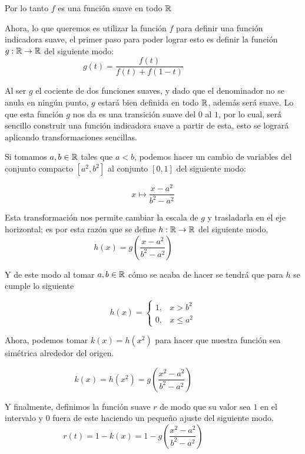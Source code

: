 \begin{example}
	Por lo tanto $f$ es una función suave en todo $\mathbb{R}$

	Ahora, lo que queremos es utilizar la función $f$ para definir una función indicadora suave, el primer paso para poder lograr esto es definir la función $g: \mathbb{R} \to \mathbb{R}$ del siguiente modo:
	\[
		g(t) = \frac{f(t)}{f(t)+f(1-t)}
		\qquad \qquad
		\begin{gathered}
			
		\end{gathered}
	\]


	Al ser $g$ el cociente de dos funciones suaves, y dado que el denominador no se anula en ningún punto, $g$ estará bien definida en todo $\mathbb{R}$, además será suave. Lo que esta función $g$ nos da es una transición suave del $0$ al $1$, por lo cual, será sencillo construir una función indicadora suave a partir de esta, esto se logrará aplicando transformaciones sencillas.

	Si tomamos $a,b \in \mathbb{R}$ tales que $a<b$, podemos hacer un cambio de variables del conjunto compacto $[a^2,b^2]$ al conjunto $[0,1]$ del siguiente modo:

	\[
		x \mapsto \frac{x - a^2}{b^2 - a^2}
	\]

	Esta transformación nos permite cambiar la escala de $g$  y trasladarla en el eje horizontal; es por esta razón que se define $h: \mathbb{R} \to \mathbb{R}$ del siguiente modo,
	\[
		h(x) = g\left(\frac{x - a^2}{b^2 - a^2}\right)
		\qquad \qquad
		\begin{gathered}
			
		\end{gathered}
	\]

	Y de este modo al tomar $a,b \in \mathbb{R}$ cómo se acaba de hacer se tendrá que para $h$ se cumple lo siguiente

	\[
		h(x) = \begin{cases}
			1, & x > b^2    \\
			0, & x \leq a^2
		\end{cases}
	\]

	Ahora, podemos tomar $k(x)=h(x^2)$ para hacer que nuestra función sea simétrica alrededor del origen.

	\[
		k(x) = h(x^2) = g\left(\frac{x^2 - a^2}{b^2 - a^2}\right)
		\qquad \qquad
		\begin{gathered}
			
		\end{gathered}
	\]



	Y finalmente, definimos la función suave $r$ de modo que su valor sea $1$ en el intervalo y $0$ fuera de este haciendo un pequeño ajuste del siguiente modo.
	\[
		r(t) = 1 - k(x) = 1 - g\left(\frac{x^2 - a^2}{b^2 - a^2}\right)
		\qquad \qquad
		\begin{gathered}
			
		\end{gathered}
	\]


\end{example}
